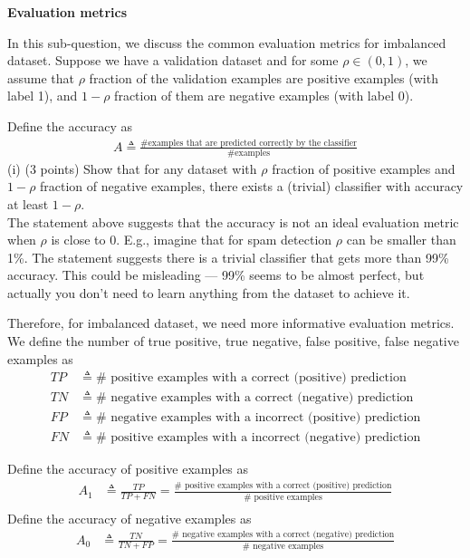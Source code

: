 \item {} \textbf{Evaluation metrics}

In this sub-question, we discuss the common evaluation metrics for imbalanced dataset. Suppose we have a validation dataset and for some $\rho \in (0,1)$, we assume that $\rho$ fraction of the validation examples are positive examples (with label 1), and $1-\rho$ fraction of them are negative examples (with label 0). 


Define the accuracy as
\begin{align*}
A \triangleq %
\frac{\# \textrm{examples that are predicted correctly by the classifier}}{\# \textrm{examples}} 
\end{align*}
(i) (3 points) Show that for any dataset with $\rho$ fraction of positive examples and $1-\rho$ fraction of negative examples, there exists a (trivial) classifier with accuracy at least $1-\rho$. 
\newline
\\
The statement above suggests that the accuracy is not an ideal evaluation metric when $\rho$ is close to 0. E.g., imagine that for spam detection $\rho$ can be smaller than 1\%. The statement suggests there is a trivial classifier that gets more than 99\% accuracy. This could be misleading ---  99\% seems to be almost perfect, but actually you don't need to learn anything from the dataset to achieve it. 

Therefore, for imbalanced dataset, we need more informative evaluation metrics. We define the number of true positive, true negative, false positive, false negative examples as
\begin{align*}
TP & \triangleq \# \textrm{ positive examples with a correct (positive) prediction} \\
TN & \triangleq \# \textrm{ negative examples with a correct (negative) prediction} \\
FP & \triangleq \# \textrm{ negative examples with a incorrect (positive) prediction} \\
FN & \triangleq \# \textrm{ positive examples with a incorrect (negative) prediction} 
\end{align*}

Define the accuracy of positive examples  as 
\newcommand{\recall}{\textup{recall}}
\begin{align*}
A_1 &\triangleq \frac{TP}{TP + FN} = \frac{\#  \textrm{ positive examples with a correct (positive) prediction}}{\# \textrm{ positive examples}}\nonumber\\
\end{align*}
Define the accuracy of negative examples as 
\begin{align*}
A_0 & \triangleq \frac{TN}{TN + FP} = \frac{\#  \textrm{ negative examples with a correct (negative) prediction}}{\# \textrm{ negative examples}}
\end{align*}

